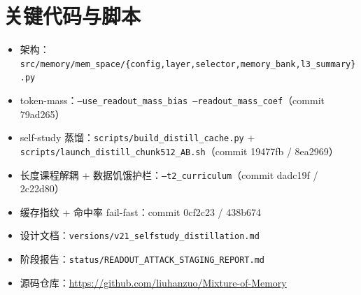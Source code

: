 \documentclass[11pt,a4paper]{ctexart}
\begin{document}
\section{关键代码与脚本}
\begin{itemize}
  \item 架构：\texttt{src/memory/mem\_space/\{config,layer,selector,memory\_bank,l3\_summary\}.py}
  \item token-mass：\texttt{--use\_readout\_mass\_bias --readout\_mass\_coef}（commit 79ad265）
  \item self-study 蒸馏：\texttt{scripts/build\_distill\_cache.py} + \texttt{scripts/launch\_distill\_chunk512\_AB.sh}（commit 19477fb / 8ea2969）
  \item 长度课程解耦 + 数据饥饿护栏：\texttt{--t2\_curriculum}（commit dadc19f / 2c22d80）
  \item 缓存指纹 + 命中率 fail-fast：commit 0cf2c23 / 438b674
  \item 设计文档：\texttt{versions/v21\_selfstudy\_distillation.md}
  \item 阶段报告：\texttt{status/READOUT\_ATTACK\_STAGING\_REPORT.md}
  \item 源码仓库：\url{https://github.com/liuhanzuo/Mixture-of-Memory}
\end{itemize}
\end{document}
